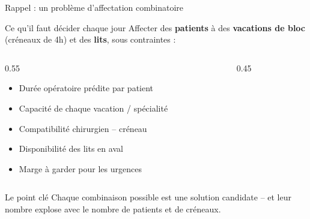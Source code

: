 
\begin{frame}{Rappel : un problème d'affectation combinatoire}
  \begin{block}{Ce qu'il faut décider chaque jour}
    Affecter des \textbf{patients} à des \textbf{vacations de bloc} (créneaux
    de 4h) et des \textbf{lits}, sous contraintes :
  \end{block}
  \begin{columns}
    \begin{column}{0.55\textwidth}
      \begin{itemize}
        \item Durée opératoire prédite par patient
        \item Capacité de chaque vacation / spécialité
        \item Compatibilité chirurgien -- créneau
        \item Disponibilité des lits en aval
        \item Marge à garder pour les urgences
      \end{itemize}
    \end{column}
    \begin{column}{0.45\textwidth}
      \centering
    \end{column}
  \end{columns}
  \begin{alertblock}{Le point clé}
    Chaque combinaison possible est une solution candidate -- et leur nombre
    explose avec le nombre de patients et de créneaux.
  \end{alertblock}
\end{frame}

